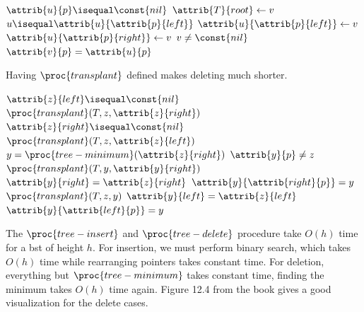 \documentclass{article}
\begin{document}
\begin{codebox}
\li \If $\attrib{u}{p} \isequal \const{nil}$
\li \Then
        $\attrib{T}{root} \gets{v}$
\li \ElseIf $u \isequal \attrib{u}{\attrib{p}{left}}$
\li \Then
        $\attrib{u}{\attrib{p}{left}} \gets{v}$
\li \Else
\li     $\attrib{u}{\attrib{p}{right}} \gets{v}$
    \End
\li \If $v \neq \const{nil}$
\li \Then
        $\attrib{v}{p} = \attrib{u}{p}$
    \End
\end{codebox}

Having $\proc{transplant}$ defined makes deleting much shorter.
\begin{codebox}
\li \If $\attrib{z}{left} \isequal \const{nil}$
\li \Then
        $\proc{transplant}(T, z, \attrib{z}{right})$
\li \ElseIf $\attrib{z}{right} \isequal \const{nil}$
\li \Then
        $\proc{transplant}(T, z, \attrib{z}{left})$
\li \Else
\li     $y = \proc{tree-minimum}(\attrib{z}{right})$
\li     \If $\attrib{y}{p} \neq z$
\li     \Then
            $\proc{transplant}(T, y, \attrib{y}{right})$
\li         $\attrib{y}{right} = \attrib{z}{right}$
\li         $\attrib{y}{\attrib{right}{p}} = y$
        \End
\li     $\proc{transplant}(T, z, y)$
\li     $\attrib{y}{left} = \attrib{z}{left}$
\li     $\attrib{y}{\attrib{left}{p}} = y$
    \End
\end{codebox}

The $\proc{tree-insert}$ and $\proc{tree-delete}$ procedure take $O(h)$ time for a bst of height $h$. For insertion, we must perform binary search, which takes $O(h)$ time while rearranging pointers takes constant time. For deletion, everything but $\proc{tree-minimum}$ takes constant time, finding the minimum takes $O(h)$ time again. Figure 12.4 from the book gives a good visualization for the delete cases.

\newpage
\end{document}

